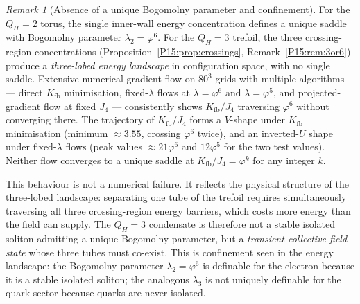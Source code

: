 \documentclass[11pt,a4paper]{article}
\theoremstyle{definition}\newtheorem{definition}[theorem]{Definition}
\theoremstyle{remark}
\newtheorem{remark}[theorem]{Remark}
\newcommand{\vp}{\varphi}
\newcommand{\lam}{\lambda}
\newcommand{\Kfb}{K_{\mathrm{fb}}}
\newcommand{\QH}{Q_H}
\begin{document}
\begin{remark}[Absence of a unique Bogomolny parameter and confinement]
\label{P15:rem:no_lambda3}
For the $\QH=2$ torus, the single inner-wall energy concentration
defines a unique saddle with Bogomolny parameter $\lam_2=\vp^6$.
For the $\QH=3$ trefoil, the three crossing-region concentrations
(Proposition~\ref{P15:prop:crossings}, Remark~\ref{P15:rem:3or6}) produce a
\emph{three-lobed energy landscape} in configuration space, with no
single saddle.
Extensive numerical gradient flow on $80^3$ grids with multiple
algorithms --- direct $\Kfb$ minimisation, fixed-$\lam$ flows at
$\lam=\vp^6$ and $\lam=\vp^5$, and projected-gradient flow at
fixed $J_4$ --- consistently shows $\Kfb/J_4$ traversing $\vp^6$
without converging there.
The trajectory of $\Kfb/J_4$ forms a $V$-shape under $\Kfb$
minimisation (minimum $\approx 3.55$, crossing $\vp^6$ twice), and
an inverted-$U$ shape under fixed-$\lam$ flows (peak values $\approx
21\vp^6$ and $12\vp^5$ for the two test values).
Neither flow converges to a unique saddle at $\Kfb/J_4=\vp^k$ for
any integer $k$.

This behaviour is not a numerical failure.
It reflects the physical structure of the three-lobed landscape:
separating one tube of the trefoil requires simultaneously traversing
all three crossing-region energy barriers, which costs more energy
than the field can supply.
The $\QH=3$ condensate is therefore not a stable isolated soliton
admitting a unique Bogomolny parameter, but a \emph{transient
collective field state} whose three tubes must co-exist.
This is confinement seen in the energy landscape: the Bogomolny
parameter $\lam_2=\vp^6$ is definable for the electron because it
is a stable isolated soliton; the analogous $\lam_3$ is not uniquely
definable for the quark sector because quarks are never isolated.


\end{remark}
\end{document}
